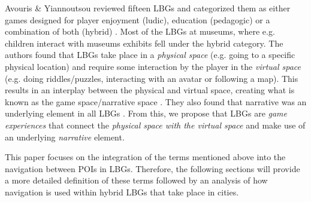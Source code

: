 

Avouris \& Yiannoutsou reviewed fifteen LBGs and categorized them as either games designed for player enjoyment (ludic), education (pedagogic) or a combination of both (hybrid) \cite{LBG_Review}. Most of the LBGs at museums, where e.g. children interact with museums exhibits fell under the hybrid category. The authors found that LBGs take place in a \textit{physical space} (e.g. going to a specific physical location) and require some interaction by the player in the \textit{virtual space} (e.g. doing riddles/puzzles, interacting with an avatar or following a map). This results in an interplay between the physical and virtual space, creating what is known as the game space/narrative space \cite{LBG_Review}. They also found that narrative was an underlying element in all LBGs \cite{LBG_Review}. From this, we propose that LBGs are \textit{game experiences} that connect the \textit{physical space with the virtual space} and make use of an underlying \textit{narrative} element.

This paper focuses on the integration of the terms mentioned above into the navigation between POIs in LBGs. Therefore, the following sections will provide a more detailed definition of these terms followed by an analysis of how navigation is used within hybrid LBGs that take place in cities.